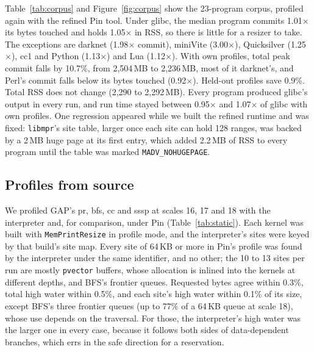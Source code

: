 \documentclass[11pt]{article}
\newcommand{\libmpr}{\texttt{libmpr}}
\newcommand{\pass}{\texttt{MemPrintResize}}
\newcommand{\secref}[1]{Section~\ref{#1}}
\newcommand{\figref}[1]{Figure~\ref{#1}}
\newcommand{\tabref}[1]{Table~\ref{#1}}
\begin{document}
\tabref{tab:corpus} and \figref{fig:corpus} show the 23-program corpus, profiled again with the refined Pin tool.
Under glibc, the median program commits 1.01$\times$ its bytes touched and holds 1.05$\times$ in RSS, so there is
little for a resizer to take. The exceptions are darknet (1.98$\times$ commit), miniVite (3.00$\times$), Quicksilver
(1.25$\times$), cc1 and Python (1.13$\times$) and Lua (1.12$\times$). With own profiles, total peak commit falls by
10.7\%, from 2{,}504\,MB to 2{,}236\,MB, most of it darknet's, and Perl's commit falls below its bytes touched
(0.92$\times$). Held-out profiles save 0.9\%. Total RSS does not change (2{,}290 to 2{,}292\,MB). Every program
produced glibc's output in every run, and run time stayed between 0.95$\times$ and 1.07$\times$ of glibc with own
profiles. One regression appeared while we built the refined runtime and was fixed: \libmpr{}'s site table, larger
once each site can hold 128 ranges, was backed by a 2\,MB huge page at its first entry, which added 2.2\,MB of RSS
to every program until the table was marked \texttt{MADV\_NOHUGEPAGE}.

\subsection{Profiles from source}
\label{sec:staticeval}

\begin{table}[t]
\centering\small
\resizebox{\linewidth}{!}{}
\caption{The interpreter's per-site profiles (\secref{sec:static}) against the Pin tool's, and what each cost, for
GAP's kernels built with \pass{} (Kronecker graphs, one trial), blocks of at least 64\,KB. Sites: in both
profiles under the pass's identifiers, of those in Pin's. Largest site difference: the largest difference in a
site's high water, as a share of its requested bytes. Times are wall times with one process on the otherwise idle
machine (native: mean of 3 runs of the same build); slowdown is over native; peak RSS of the profiling process
(Pin with the program, or the interpreter's Python process).}
\label{tab:static}
\end{table}

We profiled GAP's pr, bfs, cc and sssp at scales 16, 17 and 18 with the interpreter and, for comparison, under Pin
(\tabref{tab:static}). Each kernel was built with \pass{} in profile mode, and the interpreter's sites were keyed
by that build's site map. Every site of 64\,KB or more in Pin's profile was found by the interpreter under the same
identifier, and no other; the 10 to 13 sites per run are mostly \texttt{pvector} buffers, whose allocation is
inlined into the kernels at different depths, and BFS's frontier queues. Requested bytes agree within 0.3\%, total
high water within 0.5\%, and each site's high water within 0.1\% of its size, except BFS's three frontier queues
(up to 77\% of a 64\,KB queue at scale 18), whose use depends on the traversal. For those, the interpreter's high
water was the larger one in every case, because it follows both sides of data-dependent branches, which errs in the
safe direction for a reservation.
\end{document}
